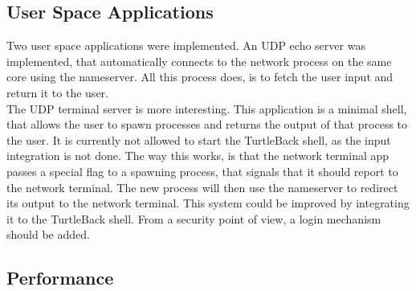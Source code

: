 \subsection{User Space Applications}
Two user space applications were implemented. An UDP echo server was implemented, that automatically connects to the network process on the same core using the nameserver. All this process does, is to fetch the user input and return it to the user.\\
The UDP terminal server is more interesting. This application is a minimal shell, that allows the user to spawn processes and returns the output of that process to the user. It is currently not allowed to start the TurtleBack shell, as the input integration is not done. The way this works, is that the network terminal app passes a special flag to a spawning process, that signals that it should report to the network terminal. The new process will then use the nameserver to redirect its output to the network terminal. This system could be improved by integrating it to the TurtleBack shell. From a security point of view, a login mechanism should be added.

\subsection{Performance}

